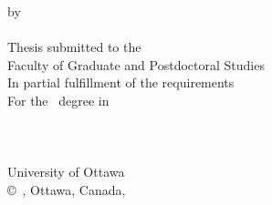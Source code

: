 
\pagestyle{empty} %

\begin{center}

\vspace*{1.0cm}
{\bf \LARGE %
  \thesistitlecoverpage}

\vspace*{1.0cm}
\normalsize
by \\
\vspace*{1.0cm}
\Large
\thesisauthor\\
\vspace*{2.0cm}
\normalsize
Thesis submitted to the\\
Faculty of Graduate and Postdoctoral Studies\\
In partial fulfillment of the requirements\\
For the \degree~degree in\\
\nameofprogram\\

\vspace*{2.0cm}
\academicunit\\
\faculty\\
University of Ottawa\\

\vspace*{2.0cm}
\copyright~\thesisauthor, Ottawa, Canada, \graduationyear\\

\end{center}

\newpage
 

\pagestyle{plain} %
\setcounter{page}{2}





